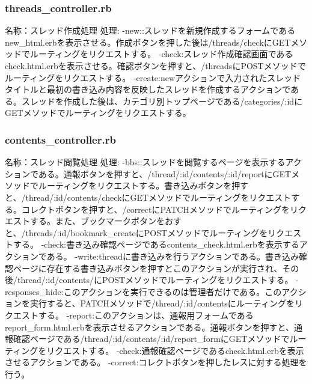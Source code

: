 \documentclass[a4j]{jarticle}
\begin{document}
\subsubsection{threads\_controller.rb}
\noindent 名称：スレッド作成処理 \newline
処理:\newline
-new::スレッドを新規作成するフォームであるnew\_html.erbを表示させる。作成ボタンを押した後は/threads/checkにGETメソッドでルーティングをリクエストする。\newline
-check:スレッド作成確認画面であるcheck.html.erbを表示させる。確認ボタンを押すと、/threadsにPOSTメソッドでルーティングをリクエストする。\newline
-create:newアクションで入力されたスレッドタイトルと最初の書き込み内容を反映したスレッドを作成するアクションである。スレッドを作成した後は、カテゴリ別トップページである/categories/:idにGETメソッドでルーティングをリクエストする。


\subsubsection{contents\_controller.rb}
\noindent 名称：スレッド閲覧処理 \newline
処理:\newline
-bbs::スレッドを閲覧するページを表示するアクションである。通報ボタンを押すと、/thread/:id/contents/:id/reportにGETメソッドでルーティングをリクエストする。書き込みボタンを押すと、/thread/:id/contents/checkにGETメソッドでルーティングをリクエストする。コレクトボタンを押すと、/correctにPATCHメソッドでルーティングをリクエストする。また、ブックマークボタンをおすと、/threads/:id/bookmark\_createにPOSTメソッドでルーティングをリクエストする。\newline
-check:書き込み確認ページであるcontents\_check.html.erbを表示するアクションである。\newline
-write:threadに書き込みを行うアクションである。書き込み確認ページに存在する書き込みボタンを押すとこのアクションが実行され、その後/thread/:id/contents/にPOSTメソッドでルーティングをリクエストする。\newline
-responses\_hide:このアクションを実行できるのは管理者だけである。このアクションを実行すると、PATCHメソッドで/thread/:id/contentsにルーティングをリクエストする。\newline
-report:このアクションは、通報用フォームであるreport\_form.html.erbを表示させるアクションである。通報ボタンを押すと、通報確認ページである/thread/:id/contents/:id/report\_formにGETメソッドでルーティングをリクエストする。\newline
-check:通報確認ページであるcheck.html.erbを表示させるアクションである。\newline
-correct:コレクトボタンを押したレスに対する処理を行う。
\end{document}
